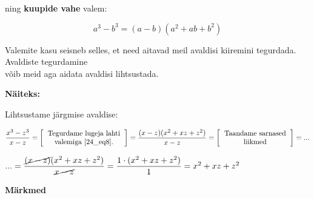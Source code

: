 \begin{center}
{{{\begin{flushleft}
\hspace{5mm}
ning \textbf{kuupide vahe} valem:

\begin{equation}
\label{24_eq8}
\boxed{a^{3}-b^{3}=(a-b)(a^{2}+ab+b^{2})}
\end{equation}

\vspace{2mm}
\hspace{5mm}
Valemite kasu seisneb selles, et need aitavad meil avaldisi kiiremini  tegurdada. Avaldiste tegurdamine\\ \hspace{5mm} võib meid aga aidata avaldisi lihtsustada.

\vspace{2mm}
\hspace{5mm}
\textbf{Näiteks:}

\vspace{2mm}
\hspace{5mm}
Lihtsustame järgmise avaldise:

\vspace{2mm}
\hspace{5mm}
$\dfrac{x^{3}-z^{3}}{x-z}=\left[ \begin{tabular}{c}
Tegurdame lugeja lahti\\
valemiga \ref{24_eq8}.
\end{tabular} \right]=\dfrac{(x-z)(x^{2}+xz+z^{2})}{x-z}=\left[ \begin{tabular}{c}
Taandame sarnased\\
liikmed
\end{tabular} \right]=...$

\vspace{5mm}
\hspace{5mm}
$...=\dfrac{\cancel{(x-z)}(x^{2}+xz+z^{2})}{\cancel{x-z}}=\dfrac{1 \cdot (x^{2}+xz+z^{2}) }{1}=x^{2}+xz+z^{2}$



\end{flushleft}
}}}
\end{center}

\pagebreak

\vspace{0.5cm}

\textbf{Märkmed}\\
\vspace{2mm}
\begin{mdframed}[style=graphpaper]
\vspace{21cm}
\end{mdframed}